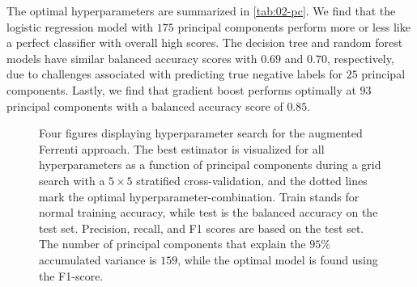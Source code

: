 The optimal hyperparameters are summarized in \autoref{tab:02-pc}. We find that the logistic regression model with $175$ principal components perform more or less like a perfect classifier with overall high scores. The decision tree and random forest models have similar balanced accuracy scores with $0.69$ and $0.70$, respectively, due to challenges associated with predicting true negative labels for $25$ principal components. Lastly, we find that gradient boost performs optimally at $93$ principal components with a balanced accuracy score of $0.85$.

\begin{figure}[ht!]
  \begin{subfigure}[b]{1.0\textwidth}
    \centering
    
  \end{subfigure}
\par\bigskip
  \begin{subfigure}[b]{0.5\textwidth}
    
    \caption{}
    \label{fig:q2-LOG}
  \end{subfigure}%
  \hfill
  \begin{subfigure}[b]{0.5\textwidth}
    
    \caption{}
    \label{fig:q2-DT}
  \end{subfigure}

  \begin{subfigure}[b]{0.5\textwidth}
    
    \caption{}
    \label{fig:q2-RF}
  \end{subfigure}%
  \hfill
  \begin{subfigure}[b]{0.5\textwidth}
    
    \caption{}
    \label{fig:q2-GB}
  \end{subfigure}
  \vspace*{-130mm}
  \caption{{Four figures displaying hyperparameter search for the augmented Ferrenti approach. The best estimator is visualized for all hyperparameters as a function of principal components during a grid search with a $5\times5$ stratified cross-validation, and the dotted lines mark the optimal hyperparameter-combination. Train stands for normal training accuracy, while test is the balanced accuracy on the test set. Precision, recall, and F1 scores are based on the test set. The number of principal components that explain the $95\%$ accumulated variance is $159$, while the optimal model is found using the F1-score.}}
  \label{fig:02-pca}
\end{figure}

